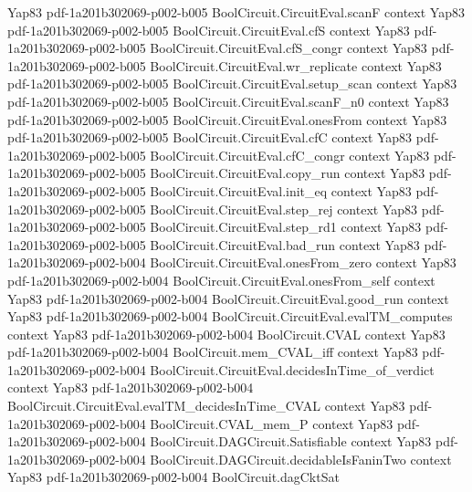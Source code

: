 \begin{theorem}
  {Yap83}
  {pdf-1a201b302069-p002-b005}
\proofstep
  {BoolCircuit.CircuitEval.scanF}
  {context}
  {Yap83}
  {pdf-1a201b302069-p002-b005}
\proofstep
  {BoolCircuit.CircuitEval.cfS}
  {context}
  {Yap83}
  {pdf-1a201b302069-p002-b005}
\proofstep
  {BoolCircuit.CircuitEval.cfS_congr}
  {context}
  {Yap83}
  {pdf-1a201b302069-p002-b005}
\proofstep
  {BoolCircuit.CircuitEval.wr_replicate}
  {context}
  {Yap83}
  {pdf-1a201b302069-p002-b005}
\proofstep
  {BoolCircuit.CircuitEval.setup_scan}
  {context}
  {Yap83}
  {pdf-1a201b302069-p002-b005}
\proofstep
  {BoolCircuit.CircuitEval.scanF_n0}
  {context}
  {Yap83}
  {pdf-1a201b302069-p002-b005}
\proofstep
  {BoolCircuit.CircuitEval.onesFrom}
  {context}
  {Yap83}
  {pdf-1a201b302069-p002-b005}
\proofstep
  {BoolCircuit.CircuitEval.cfC}
  {context}
  {Yap83}
  {pdf-1a201b302069-p002-b005}
\proofstep
  {BoolCircuit.CircuitEval.cfC_congr}
  {context}
  {Yap83}
  {pdf-1a201b302069-p002-b005}
\proofstep
  {BoolCircuit.CircuitEval.copy_run}
  {context}
  {Yap83}
  {pdf-1a201b302069-p002-b005}
\proofstep
  {BoolCircuit.CircuitEval.init_eq}
  {context}
  {Yap83}
  {pdf-1a201b302069-p002-b005}
\proofstep
  {BoolCircuit.CircuitEval.step_rej}
  {context}
  {Yap83}
  {pdf-1a201b302069-p002-b005}
\proofstep
  {BoolCircuit.CircuitEval.step_rd1}
  {context}
  {Yap83}
  {pdf-1a201b302069-p002-b005}
\proofstep
  {BoolCircuit.CircuitEval.bad_run}
  {context}
  {Yap83}
  {pdf-1a201b302069-p002-b004}
\proofstep
  {BoolCircuit.CircuitEval.onesFrom_zero}
  {context}
  {Yap83}
  {pdf-1a201b302069-p002-b004}
\proofstep
  {BoolCircuit.CircuitEval.onesFrom_self}
  {context}
  {Yap83}
  {pdf-1a201b302069-p002-b004}
\proofstep
  {BoolCircuit.CircuitEval.good_run}
  {context}
  {Yap83}
  {pdf-1a201b302069-p002-b004}
\proofstep
  {BoolCircuit.CircuitEval.evalTM_computes}
  {context}
  {Yap83}
  {pdf-1a201b302069-p002-b004}
\proofstep
  {BoolCircuit.CVAL}
  {context}
  {Yap83}
  {pdf-1a201b302069-p002-b004}
\proofstep
  {BoolCircuit.mem_CVAL_iff}
  {context}
  {Yap83}
  {pdf-1a201b302069-p002-b004}
\proofstep
  {BoolCircuit.CircuitEval.decidesInTime_of_verdict}
  {context}
  {Yap83}
  {pdf-1a201b302069-p002-b004}
\proofstep
  {BoolCircuit.CircuitEval.evalTM_decidesInTime_CVAL}
  {context}
  {Yap83}
  {pdf-1a201b302069-p002-b004}
\proofstep
  {BoolCircuit.CVAL_mem_P}
  {context}
  {Yap83}
  {pdf-1a201b302069-p002-b004}
\proofstep
  {BoolCircuit.DAGCircuit.Satisfiable}
  {context}
  {Yap83}
  {pdf-1a201b302069-p002-b004}
\proofstep
  {BoolCircuit.DAGCircuit.decidableIsFaninTwo}
  {context}
  {Yap83}
  {pdf-1a201b302069-p002-b004}
\proofstep
  {BoolCircuit.dagCktSat}

\end{theorem}
